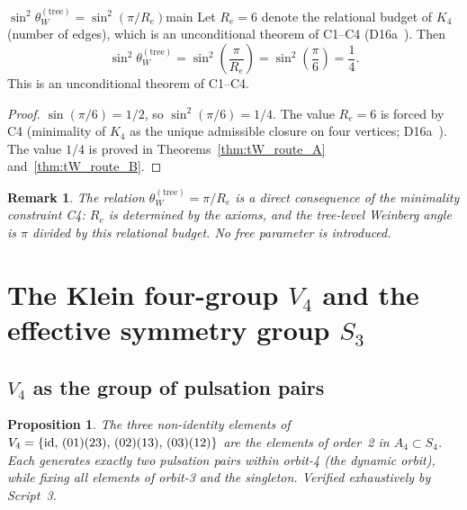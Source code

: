 \documentclass[11pt,a4paper]{article}
\newtheorem{proposition}{Proposition}[section]
\newtheorem{remark}{Remark}[section]
\newcommand{\Kfour}{K_4}
\newcommand{\Retot}{R_e}
\newcommand{\sinW}{\sin^2\!\theta_W}
\newcommand{\thetaW}{\theta_W}
\begin{document}
\begin{theorembox}{$\sinW^{(\mathrm{tree})} = \sin^2(\pi/\Retot)$}{main}
Let $\Retot = 6$ denote the relational budget of $\Kfour$ (number of edges), which is an unconditional theorem of C1--C4 (D16a~\cite{PDL_D16a}). Then
\begin{equation}
\sinW^{(\mathrm{tree})} = \sin^2\!\left(\frac{\pi}{\Retot}\right) = \sin^2\!\left(\frac{\pi}{6}\right) = \frac{1}{4}.
\label{eq:main}
\end{equation}
This is an unconditional theorem of C1--C4.
\end{theorembox}

\begin{proof}
$\sin(\pi/6) = 1/2$, so $\sin^2(\pi/6) = 1/4$. The value $\Retot = 6$ is forced by C4 (minimality of $\Kfour$ as the unique admissible closure on four vertices; D16a~\cite{PDL_D16a}). The value $1/4$ is proved in Theorems~\ref{thm:tW_route_A} and~\ref{thm:tW_route_B}.
\end{proof}

\begin{remark}
The relation $\thetaW^{(\mathrm{tree})} = \pi/\Retot$ is a direct consequence of the minimality constraint C4: $\Retot$ is determined by the axioms, and the tree-level Weinberg angle is $\pi$ divided by this relational budget. No free parameter is introduced.
\end{remark}

\section{The Klein four-group \texorpdfstring{$V_4$}{V4} and the effective symmetry group \texorpdfstring{$S_3$}{S3}}
\label{sec:V4}

\subsection{\texorpdfstring{$V_4$}{V4} as the group of pulsation pairs}
\label{subsec:V4_pulsation}

\begin{proposition}
\label{prop:V4_pulsation}
The three non-identity elements of $V_4 = \{{\rm id},\, (01)(23),\, (02)(13),\, (03)(12)\}$ are the elements of order~2 in $A_4 \subset S_4$. Each generates exactly two pulsation pairs within orbit-4 (the dynamic orbit), while fixing all elements of orbit-3 and the singleton. Verified exhaustively by Script~3.
\end{proposition}
\end{document}
